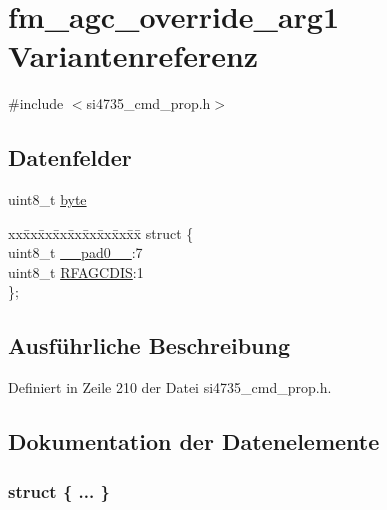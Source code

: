 \hypertarget{unionfm__agc__override__arg1}{}\section{fm\+\_\+agc\+\_\+override\+\_\+arg1 Variantenreferenz}
\label{unionfm__agc__override__arg1}


{\ttfamily \#include $<$si4735\+\_\+cmd\+\_\+prop.\+h$>$}

\subsection*{Datenfelder}
\begin{DoxyCompactItemize}
\item 
uint8\+\_\+t \hyperlink{unionfm__agc__override__arg1_a96f44d20f1dbf1c8785a7bc99a46164c}{byte}
\item 
\begin{tabbing}
xx\=xx\=xx\=xx\=xx\=xx\=xx\=xx\=xx\=\kill
struct \{\\
\>uint8\_t \hyperlink{unionfm__agc__override__arg1_a8b4eebe79ded0459acec2f4950102ba3}{\_\_pad0\_\_}:7\\
\>uint8\_t \hyperlink{unionfm__agc__override__arg1_a08f693cbe8c1321a038234eb53d365b9}{RFAGCDIS}:1\\
\}; \\

\end{tabbing}\end{DoxyCompactItemize}


\subsection{Ausführliche Beschreibung}


Definiert in Zeile 210 der Datei si4735\+\_\+cmd\+\_\+prop.\+h.



\subsection{Dokumentation der Datenelemente}
\hypertarget{unionfm__agc__override__arg1_a0f6e509018149f2da9f81df680911459}{}\subsubsection[{"@33}]{\setlength{\rightskip}{0pt plus 5cm}struct \{ ... \} }\label{unionfm__agc__override__arg1_a0f6e509018149f2da9f81df680911459}
\hypertarget{unionfm__agc__override__arg1_a8b4eebe79ded0459acec2f4950102ba3}{}
